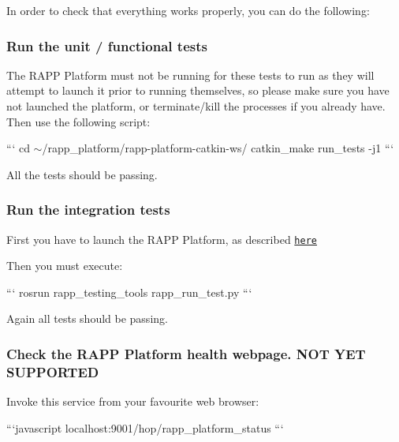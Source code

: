 In order to check that everything works properly, you can do the following\-:

\subsubsection*{Run the unit / functional tests}

The R\-A\-P\-P Platform must not be running for these tests to run as they will attempt to launch it prior to running themselves, so please make sure you have not launched the platform, or terminate/kill the processes if you already have. Then use the following script\-:

``` cd $\sim$/rapp\-\_\-platform/rapp-\/platform-\/catkin-\/ws/ catkin\-\_\-make run\-\_\-tests -\/j1 ```

All the tests should be passing.

\subsubsection*{Run the integration tests}

First you have to launch the R\-A\-P\-P Platform, as described \href{https://github.com/rapp-project/rapp-platform/wiki/How-do-I-launch-the-RAPP-Platform%3F}{\tt here}

Then you must execute\-:

``` rosrun rapp\-\_\-testing\-\_\-tools rapp\-\_\-run\-\_\-test.\-py ```

Again all tests should be passing.

\subsubsection*{Check the R\-A\-P\-P Platform health webpage. N\-O\-T Y\-E\-T S\-U\-P\-P\-O\-R\-T\-E\-D}

Invoke this service from your favourite web browser\-:

```javascript localhost\-:9001/hop/rapp\-\_\-platform\-\_\-status ``` 